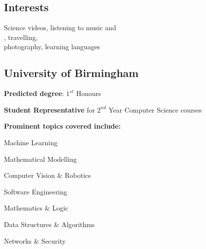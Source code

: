 \documentclass[]{jonas-cv}
\begin{document}
\begin{minipage}[t]{0.33\textwidth}
\subsection{Interests}
Science videos, listening to music and\\
, travelling,\\
photography, learning languages

\largesectionsep

\tinysectionsep
\vspace{0.25mm}


\subsection{University of Birmingham}

\begin{tightemize}
    \item \textbf{Predicted degree}: $1^{st}$ Honours
    \item \textbf{Student Representative} for $2^{nd}$ Year Computer Science courses
    \item \textbf{Prominent topics covered include:}\\
    \vspace{1mm}
    \begin{tightemize}
        \item[\chevronCircleRightSymbol] Machine Learning \\
        \item[\chevronCircleRightSymbol] Mathematical Modelling \\
        \item[\chevronCircleRightSymbol] Computer Vision \& Robotics \\
        \item[\chevronCircleRightSymbol] Software Engineering \\
        \item[\chevronCircleRightSymbol] Mathematics \& Logic \\
        \item[\chevronCircleRightSymbol] Data Structures \& Algorithms \\
        \item[\chevronCircleRightSymbol] Networks \& Security
    \end{tightemize}
\end{tightemize}
\largesectionsep



\end{minipage}
\end{document}
